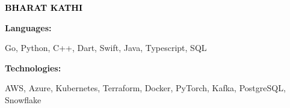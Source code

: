 \documentclass[9pt]{developercv} %
\begin{document}

\begin{minipage}[t]{0.5\textwidth} 
	\vspace{-\baselineskip} %
	
	{ \fontsize{16}{20} \textcolor{black}{\textbf{\MakeUppercase{Bharat Kathi}}}} %
	
	\vspace{6pt}
    \hspace{8pt}

    \hspace{24pt}
    
\end{minipage}
\hfill
\begin{minipage}[t]{0.5\textwidth}
    \vspace{-18pt}
    \vspace{-6pt}
    
    \begin{minipage}[t]{0.2\textwidth}
        \textbf{Languages:}
    \end{minipage}
    \hfill
    \begin{minipage}[t]{0.73\textwidth}
       Go, Python, C++, Dart, Swift, Java, Typescript, SQL
    \end{minipage}
    \vspace{5 pt}
    
    \begin{minipage}[t]{0.2\textwidth}
        \textbf{Technologies:}
    \end{minipage}
    \hfill
    \begin{minipage}[t]{0.73\textwidth}
        AWS, Azure, Kubernetes, Terraform, Docker, PyTorch, Kafka, PostgreSQL, Snowflake
    \end{minipage}
    
\end{minipage}
\end{document}
